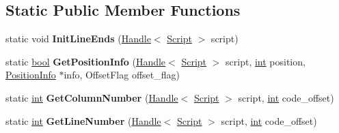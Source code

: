 \subsection*{Static Public Member Functions}
\begin{DoxyCompactItemize}
\item 
\mbox{\label{classv8_1_1internal_1_1Script_ab34230113920d04f77c2a884c47a9506}} 
static void {\bfseries Init\+Line\+Ends} (\mbox{\hyperlink{classv8_1_1internal_1_1Handle}{Handle}}$<$ \mbox{\hyperlink{classv8_1_1internal_1_1Script}{Script}} $>$ script)
\item 
\mbox{\label{classv8_1_1internal_1_1Script_ab0ae2965fda7feb89d204ee88af53c08}} 
static \mbox{\hyperlink{classbool}{bool}} {\bfseries Get\+Position\+Info} (\mbox{\hyperlink{classv8_1_1internal_1_1Handle}{Handle}}$<$ \mbox{\hyperlink{classv8_1_1internal_1_1Script}{Script}} $>$ script, \mbox{\hyperlink{classint}{int}} position, \mbox{\hyperlink{structv8_1_1internal_1_1Script_1_1PositionInfo}{Position\+Info}} $\ast$info, Offset\+Flag offset\+\_\+flag)
\item 
\mbox{\label{classv8_1_1internal_1_1Script_a10d1a2d6ae54fd05c404861229b6e674}} 
static \mbox{\hyperlink{classint}{int}} {\bfseries Get\+Column\+Number} (\mbox{\hyperlink{classv8_1_1internal_1_1Handle}{Handle}}$<$ \mbox{\hyperlink{classv8_1_1internal_1_1Script}{Script}} $>$ script, \mbox{\hyperlink{classint}{int}} code\+\_\+offset)
\item 
\mbox{\label{classv8_1_1internal_1_1Script_a362a2b70d823f4a69bc557113850a2c1}} 
static \mbox{\hyperlink{classint}{int}} {\bfseries Get\+Line\+Number} (\mbox{\hyperlink{classv8_1_1internal_1_1Handle}{Handle}}$<$ \mbox{\hyperlink{classv8_1_1internal_1_1Script}{Script}} $>$ script, \mbox{\hyperlink{classint}{int}} code\+\_\+offset)
\end{DoxyCompactItemize}
